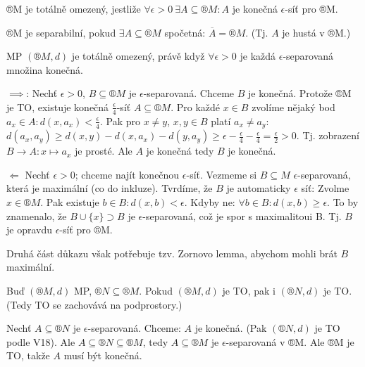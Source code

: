 \documentclass[12pt]{article}					%
\begin{document}
    \begin{definice}
        ®M je totálně omezený, jestliže $\forall \epsilon > 0\ \exists A \subseteq ®M: A$ je konečná $\epsilon$-síť pro ®M.

        ®M je separabilní, pokud $\exists A \subseteq ®M$ spočetná: $\overline{A} = ®M$. (Tj. $A$ je hustá v ®M.)
    \end{definice}

    \begin{veta}
        MP $(®M, d)$ je totálně omezený, právě když $\forall \epsilon > 0$ je každá $\epsilon$-separovaná množina konečná.

        \begin{dukazin}
            $\implies$: Nechť $\epsilon > 0$, $B \subseteq ®M$ je $\epsilon$-separovaná. Chceme $B$ je konečná. Protože ®M je TO, existuje konečná $\frac{\epsilon}{4}$-síť $A \subseteq ®M$. Pro každé $x \in B$ zvolíme nějaký bod $a_x \in A: d(x, a_x) < \frac{\epsilon}{4}$. Pak pro $x≠y$, $x, y \in B$ platí $a_x ≠ a_y$: $d(a_x, a_y) ≥ d(x, y) - d(x, a_x) - d(y, a_y) ≥ \epsilon - \frac{\epsilon}{4} - \frac{\epsilon}{4} = \frac{\epsilon}{2} > 0$. Tj. zobrazení $B \rightarrow A: x \mapsto a_x$ je prosté. Ale $A$ je konečná tedy $B$ je konečná.

            $\Leftarrow$ Nechť $\epsilon > 0$; chceme najít konečnou $\epsilon$-síť. Vezmeme si $B \subseteq M$ $\epsilon$-separovaná, která je maximální (co do inkluze). Tvrdíme, že $B$ je automaticky $\epsilon$ síť: Zvolme $x \in ®M$. Pak existuje $b \in B: d(x, b) < \epsilon$. Kdyby ne: $\forall b \in B: d(x, b) ≥ \epsilon$. To by znamenalo, že $B \cup \{x\} \supset B$ je $\epsilon$-separovaná, což je spor s maximalitoui B. Tj. $B$ je opravdu $\epsilon$-síť pro ®M.

            Druhá část důkazu však potřebuje tzv. Zornovo lemma, abychom mohli brát $B$ maximální.
        \end{dukazin}
    \end{veta}


    \begin{veta}
        Buď $(®M, d)$ MP, $®N \subseteq ®M$. Pokud $(®M, d)$ je TO, pak i $(®N, d)$ je TO. (Tedy TO se zachovává na podprostory.)

        \begin{dukazin}
            Nechť $A \subseteq ®N$ je $\epsilon$-separovaná. Chceme: $A$ je konečná. (Pak $(®N, d)$ je TO podle V18). Ale $A \subseteq ®N \subseteq ®M$, tedy $A \subseteq ®M$ je $\epsilon$-separovaná v ®M. Ale ®M je TO, takže $A$ musí být konečná.
        \end{dukazin}
    \end{veta}
    
\end{document}
